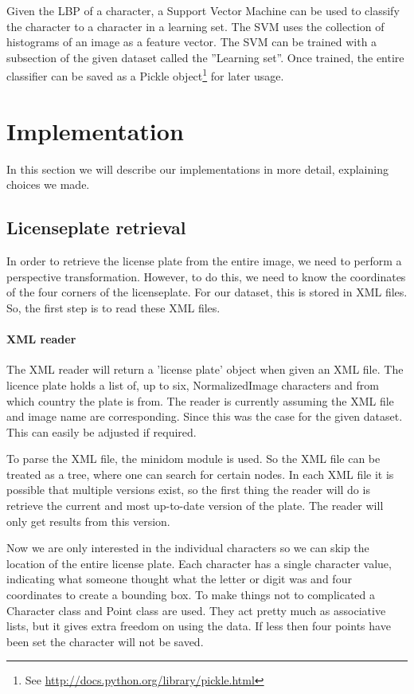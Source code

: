 \documentclass[a4paper]{article}
\begin{document}
Given the LBP of a character, a Support Vector Machine can be used to classify
the character to a character in a learning set. The SVM uses the collection of
histograms of an image as a feature vector.  The SVM can be trained with a
subsection of the given dataset called the ''Learning set''. Once trained, the
entire classifier can be saved as a Pickle object\footnote{See
\url{http://docs.python.org/library/pickle.html}} for later usage.

\section{Implementation}

In this section we will describe our implementations in more detail, explaining
choices we made.

\subsection{Licenseplate retrieval}

In order to retrieve the license plate from the entire image, we need to
perform a perspective transformation. However, to do this, we need to know the 
coordinates of the four corners of the licenseplate. For our dataset, this is
stored in XML files. So, the first step is to read these XML files.

\paragraph*{XML reader}

The XML reader will return a 'license plate' object when given an XML file. The
licence plate holds a list of, up to six, NormalizedImage characters and from
which country the plate is from. The reader is currently assuming the XML file
and image name are corresponding. Since this was the case for the given
dataset. This can easily be adjusted if required. 

To parse the XML file, the minidom module is used. So the XML file can be
treated as a tree, where one can search for certain nodes. In each XML
file it is possible that multiple versions exist, so the first thing the reader
will do is retrieve the current and most up-to-date version of the plate. The
reader will only get results from this version.

Now we are only interested in the individual characters so we can skip the
location of the entire license plate. Each character has 
a single character value, indicating what someone thought what the letter or
digit was and four coordinates to create a bounding box. To make things not to
complicated a Character class and Point class are used. They
act pretty much as associative lists, but it gives extra freedom on using the
data. If less then four points have been set the character will not be saved.
\end{document}
